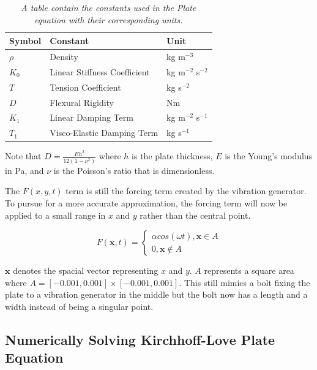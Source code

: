 \begin{table}[H]
    \centering
\begin{tabular}{|p{1.2cm}||p{3cm}p{1.6cm}|}
    \hline
    Symbol& Constant& Unit\\
    \hline
    \hline
    $\rho$& Density& kg m$^{-3}$\\
    \hline
    $K_0$& Linear Stiffness Coefficient& kg m$^{-2}$ s$^{-2}$\\
    \hline
    $T$& Tension Coefficient& kg s$^{-2}$\\
    \hline
    $D$& Flexural Rigidity& Nm\\
    \hline
    $K_1$& Linear Damping Term& kg m$^{-2}$ s$^{-1}$\\
    \hline
    $T_1$& Visco-Elastic Damping Term& kg s$^{-1}$\\
    \hline
\end{tabular}
\caption{\textit{\small A table contain the constants used in the Plate equation with their corresponding units.}}
\end{table}

Note that $D = \frac{Eh^3}{12(1-\nu^2)}$ where $h$ is the plate thickness, $E$ is the Young's modulus in Pa, and $\nu$ is the Poisson's ratio that is dimensionless.

The $F(x,y,t)$ term is still the forcing term created by the vibration generator. To pursue for a more accurate approximation, the forcing term will now be applied to a small range in $x$ and $y$ rather than the central point.

\begin{equation}
    F(\mathbf{x},t) = 
    \begin{cases}
        \alpha cos(\omega t), \mathbf{x} \in A\\
        0, \mathbf{x} \notin A
    \end{cases}
\end{equation}

$\mathbf{x}$ denotes the spacial vector representing $x$ and $y$. $A$ represents a square area where $A = [-0.001,0.001]\times[-0.001,0.001]$. This still mimics a bolt fixing the plate to a vibration generator in the middle but the bolt now has a length and a width instead of being a singular point.

\subsection{Numerically Solving Kirchhoff-Love Plate Equation}

